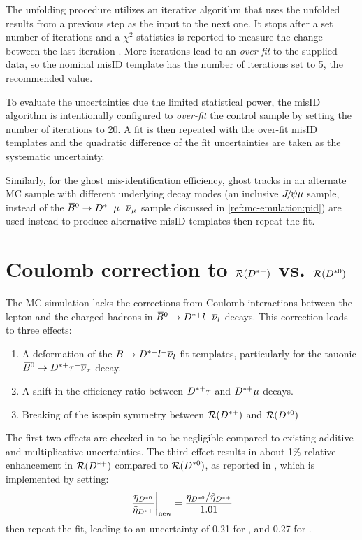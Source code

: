The unfolding procedure utilizes an iterative algorithm that uses the unfolded
results from a previous step as the input to the next one.
It stops after a set number of iterations and a $\chi^2$ statistics is reported
to measure the change between the last iteration \cite{DAGOSTINI1995487}.
More iterations lead to an \emph{over-fit} to the supplied data,
so the nominal misID template has the number of iterations set to 5,
the recommended value.

To evaluate the uncertainties due the limited statistical power,
the misID algorithm is intentionally configured to \emph{over-fit} the control
sample by setting the number of iterations to 20.
A fit is then repeated with the over-fit misID templates and the quadratic
difference of the fit uncertainties are taken as the systematic uncertainty.

Similarly, for the ghost mis-identification efficiency,
ghost tracks in an alternate MC sample with different underlying decay modes
(an inclusive ${{J\mskip -3mu/\mskip -2mu\psi}}{\mu}$ sample,
instead of the ${{\kern 0.18em\overline{\kern -0.18em B}}{}^0} \rightarrow {\ensuremath{{D}^{*+}}} {\ensuremath{\mu^-}}{\ensuremath{{\overline{\nu}}_\mu}}$ sample discussed in
\cref{ref:mc-emulation:pid})
are used instead to produce alternative misID templates then repeat the fit.


\section{Coulomb correction to $\mathcal{R}({{D}^{*+}})$ vs. $\mathcal{R}({{D}^{*0}})$}
\label{sys-theory-coulomb}

The MC simulation lacks the corrections from Coulomb interactions between
the lepton and the charged hadrons in
${{\kern 0.18em\overline{\kern -0.18em B}}{}^0} \rightarrow {\ensuremath{{D}^{*+}}}{\ensuremath{l^-}}{\ensuremath{{\overline{\nu}}_l}}$ decays.
This correction leads to three effects:

\begin{enumerate}
    \item A deformation of the
        $B \rightarrow {\ensuremath{{D}^{*+}}}{\ensuremath{l^-}}{\ensuremath{{\overline{\nu}}_l}}$ fit templates,
        particularly for the tauonic
        ${{\kern 0.18em\overline{\kern -0.18em B}}{}^0} \rightarrow {\ensuremath{{D}^{*+}}}{\ensuremath{\tau^-}}{\ensuremath{{\overline{\nu}}_\tau}}$ decay.
    \item A shift in the efficiency ratio between ${{D}^{*+}}\tau$ and ${{D}^{*+}}\mu$
        decays.
    \item Breaking of the isospin symmetry between
        $\mathcal{R}({{D}^{*+}})$ and $\mathcal{R}({{D}^{*0}})$
\end{enumerate}

The first two effects are checked in \cite{LHCb-ANA-2020-056} to be negligible
compared to existing additive and multiplicative uncertainties.
The third effect results in about 1\% relative enhancement in $\mathcal{R}
({{D}^{*+}})$ compared to $\mathcal{R}({{D}^{*0}})$,
as reported in \cite{Cal__2019},
which is implemented by setting:
\begin{equation}
    \left.\frac{{\eta}_{{{D}^{*0}}}}{\tilde{\eta}_{{{D}^{*+}}}}\right|_\text{new} =
    \frac{{\eta}_{{{D}^{*0}}} / \tilde{\eta}_{{{D}^{*+}}}}{1.01}
\end{equation}
then repeat the fit,
leading to an uncertainty of 0.21 for \RD,
and 0.27 for \RDst.

